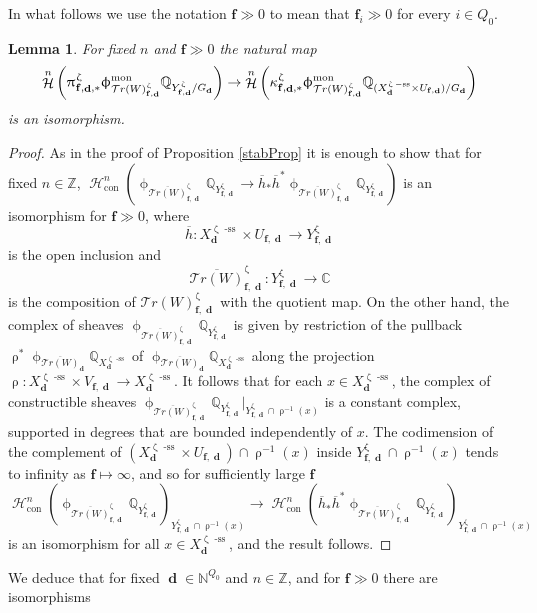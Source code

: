 \documentclass[a4paper,10pt]{amsart}
\renewcommand{\zeta}{\upzeta}
\renewcommand{\pi}{\uppi\hspace{0.05em}}
\renewcommand{\rho}{\uprho}
\renewcommand{\phi}{\upphi}
\newtheorem{lemma}[theorem]{Lemma}
\newcommand{\ff}{\mathbf{f}}
\newcommand{\WW}{\mathcal{T}r(W)}
\newcommand{\phim}[1]{\phi^{\mon}_{#1}}
\DeclareMathOperator{\sst}{-ss}
\DeclareMathOperator{\mon}{mon}
\DeclareMathOperator{\dd}{\mathbf{d}}
\DeclareMathOperator{\con}{con}
\DeclareMathOperator{\Ho}{\mathcal{H}}
\begin{document}
In what follows we use the notation $\ff\gg 0$ to mean that $\ff_i\gg 0$ for every $i\in Q_0$.  
\begin{lemma}
\label{appLem}
For fixed $n$ and $\ff\gg 0$ the natural map
\[
\Ho^n\left(\pi ^{\zeta}_{\ff,\dd,*}\phim{\WW^{\zeta}_{\ff,\dd}}\mathbb{Q}_{Y_{\ff,\dd}^{\zeta}/G_{\dd}}\right)\rightarrow\Ho^n\left(\kappa^{\zeta}_{\ff,\dd,*}\phim{\WW^{\zeta}_{\ff,\dd}}\mathbb{Q}_{(X_{\dd}^{\zeta\sst}\times U_{\ff,\dd})/G_{\dd}}\right) 
\]
is an isomorphism.
\end{lemma}
\begin{proof}
As in the proof of Proposition \ref{stabProp} it is enough to show that for fixed $n\in\mathbb{Z}$, $\Ho_{\con}^n\left(\phi_{\overline{\WW}_{\ff,\dd}^{\zeta}}\mathbb{Q}_{Y_{\ff,\dd}^{\zeta}}\rightarrow\overline{h}_*\overline{h}^*\phi_{\overline{\WW}_{\ff,\dd}^{\zeta}}\mathbb{Q}_{Y_{\ff,\dd}^{\zeta}}\right)$ is an isomorphism for $\ff\gg 0$, where
\[
\overline{h}\colon X_{\dd}^{\zeta\sst}\times U_{\ff,\dd} \rightarrow Y_{\ff,\dd}^{\zeta}
\]
is the open inclusion and 
\[
\overline{\WW}_{\ff,\dd}^{\zeta}\colon Y_{\ff,\dd}^{\zeta}\rightarrow \mathbb{C}
\]
is the composition of $\WW_{\ff,\dd}^{\zeta}$ with the quotient map.  On the other hand, the complex of sheaves $\phi_{\overline{\WW}_{\ff,\dd}^{\zeta}}\mathbb{Q}_{Y_{\ff,\dd}^{\zeta}}$ is given by restriction of the pullback $\rho^*\phi_{\overline{\WW}_{\dd}}\mathbb{Q}_{X^{\zeta\sst}_{\dd}}$ of $\phi_{\overline{\WW}_{\dd}}\mathbb{Q}_{X^{\zeta\sst}_{\dd}}$ along the projection $\rho\colon X^{\zeta\sst}_{\dd}\times V_{\ff,\dd}\rightarrow X^{\zeta\sst}_{\dd}$.  It follows that for each $x\in X_{\dd}^{\zeta\sst}$, the complex of constructible sheaves $\phi_{\overline{\WW}_{\ff,\dd}^{\zeta}}\mathbb{Q}_{Y_{\ff,\dd}^{\zeta}}|_{Y_{\ff,\dd}^{\zeta}\cap\rho^{-1}(x)}$ is a constant complex, supported in degrees that are bounded independently of $x$.  The codimension of the complement of $(X_{\dd}^{\zeta\sst}\times U_{\ff,\dd})\cap\rho^{-1}(x)$ inside $Y_{\ff,\dd}^{\zeta}\cap{\rho^{-1}(x)}$ tends to infinity as $\ff\mapsto\infty$, and so for sufficiently large $\ff$
\[
\Ho_{\con}^n\left(\phi_{\overline{\WW}_{\ff,\dd}^{\zeta}}\mathbb{Q}_{Y_{\ff,\dd}^{\zeta}}\right)_{Y_{\ff,\dd}^{\zeta}\cap\rho^{-1}(x)}\rightarrow\Ho_{\con}^n\left(\overline{h}_*\overline{h}^*\phi_{\overline{\WW}_{\ff,\dd}^{\zeta}}\mathbb{Q}_{Y_{\ff,\dd}^{\zeta}}\right)_{Y_{\ff,\dd}^{\zeta}\cap\rho^{-1}(x)}
\]
is an isomorphism for all $x\in X^{\zeta\sst}_{\dd}$, and the result follows.
\end{proof}
We deduce that for fixed $\dd\in\mathbb{N}^{Q_0}$ and $n\in\mathbb{Z}$, and for $\ff\gg 0$ there are isomorphisms
\end{document}
